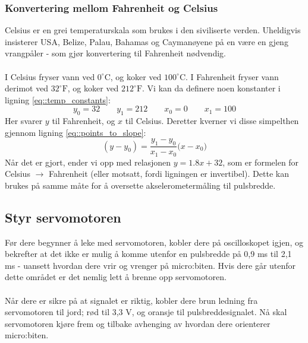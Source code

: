 \documentclass[11pt,a4paper]{article}
\begin{document}
\subsubsection{Konvertering mellom Fahrenheit og Celsius}
\label{sec::convert_f_to_c}
Celsius er en grei temperaturskala som brukes i den siviliserte verden. Uheldigvis insisterer USA, Belize, Palau, Bahamas og Caymanøyene på en være en gjeng vrangpåler - som gjør konvertering til Fahrenheit nødvendig.\\
\\
I Celsius fryser vann ved $0^\circ\mathrm{C}$, og koker ved $100^\circ\mathrm{C}$. I Fahrenheit fryser vann derimot ved $32^\circ\mathrm{F}$, og koker ved $212^\circ\mathrm{F}$. Vi kan da definere noen konstanter i ligning \ref{eq::temp_constants}:
\begin{equation}
y_0 = 32\qquad y_1 = 212\qquad x_0 = 0\qquad x_1 = 100
\label{eq::temp_constants}
\end{equation}
Her svarer $y$ til Fahrenheit, og $x$ til Celsius. Deretter kverner vi disse simpelthen gjennom ligning \ref{eq::points_to_slope}:
\begin{equation}
(y - y_0) = \frac{y_1 - y_0}{x_1 - x_0}\bigg(x - x_0\bigg)
\label{eq::points_to_slope}
\end{equation}
Når det er gjort, ender vi opp med relasjonen $y = 1.8 x + 32$, som er formelen for Celsius $\rightarrow$ Fahrenheit (eller motsatt, fordi ligningen er invertibel). Dette kan brukes på samme måte for å oversette akselerometermåling til pulsbredde.

\subsection{Styr servomotoren}
Før dere begynner å leke med servomotoren, kobler dere på oscilloskopet igjen, og bekrefter at det ikke er mulig å komme utenfor en pulsbredde på 0,9 ms til 2,1 ms - uansett hvordan dere vrir og vrenger på micro:biten. Hvis dere går utenfor dette området er det nemlig lett å brenne opp servomotoren.\\
\\
Når dere er sikre på at signalet er riktig, kobler dere brun ledning fra servomotoren til jord; rød til 3,3 V, og oransje til pulsbreddesignalet. Nå skal servomotoren kjøre frem og tilbake avhenging av hvordan dere orienterer micro:biten.
\end{document}
